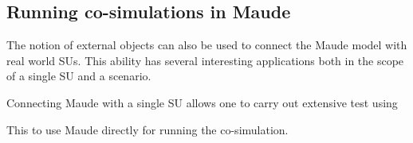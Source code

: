 \subsection{Running co-simulations in Maude}
The notion of external objects can also be used to connect the Maude model with real world SUs.
This ability has several interesting applications both in the scope of a single SU and a scenario.

Connecting Maude with a single SU allows one to carry out extensive test using 

This to use Maude directly for running the co-simulation.
